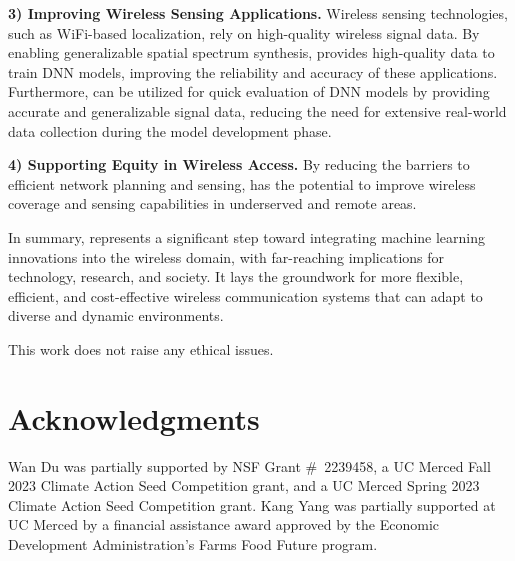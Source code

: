 \textbf{3) Improving Wireless Sensing Applications.}
Wireless sensing technologies, such as WiFi-based localization, rely on high-quality wireless signal data.  
By enabling generalizable spatial spectrum synthesis, \ourSystem provides high-quality data to train DNN models, improving the reliability and accuracy of these applications. 
Furthermore, \ourSystem can be utilized for quick evaluation of DNN models by providing accurate and generalizable signal data, reducing the need for extensive real-world data collection during the model development phase.


\textbf{4) Supporting Equity in Wireless Access.}  
By reducing the barriers to efficient network planning and sensing, \ourSystem has the potential to improve wireless coverage and sensing capabilities in underserved and remote areas. 


In summary, \ourSystem represents a significant step toward integrating machine learning innovations into the wireless domain, with far-reaching implications for technology, research, and society. 
It lays the groundwork for more flexible, efficient, and cost-effective wireless communication systems that can adapt to diverse and dynamic environments.

This work does not raise any ethical issues.



\section*{Acknowledgments}
Wan Du was partially supported by NSF Grant \#~2239458, a UC Merced Fall 2023 Climate Action Seed Competition grant, and a UC Merced Spring 2023 Climate Action Seed Competition grant. 
Kang Yang was partially supported at UC Merced by a financial assistance award approved by the Economic Development Administration’s Farms Food Future program.
